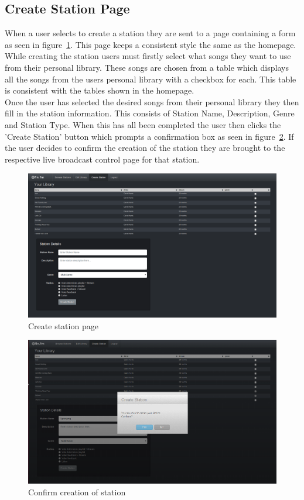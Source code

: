 \documentclass[a4paper, 12pt]{report}
\begin{document}
\subsection{Create Station Page}
When a user selects to create a station they are sent to a page containing a form as seen in figure~\ref{create station}. This page keeps a consistent style the same as the homepage. While creating the station users must firstly select what songs they want to use from their personal library. These songs are chosen from a table which displays all the songs from the users personal library with a checkbox for each. This table is consistent with the tables shown in the homepage.\\
Once the user has selected the desired songs from their personal library they then fill in the station information. This consists of Station Name, Description, Genre and Station Type. When this has all been completed the user then clicks the 'Create Station' button which prompts a confirmation box as seen in figure~\ref{create-confirm}. If the user decides to confirm the creation of the station they are brought to the respective live broadcast control page for that station.
\begin{figure}[H]
  \centering
    \includegraphics[width=1.0\textwidth]{screenshots/create-station.png}
    \caption{Create station page}
    \label{create station}
\end{figure}
\begin{figure}[H]
  \centering
    \includegraphics[width=1.0\textwidth]{screenshots/create-station-confirm.png}
    \caption{Confirm creation of station}
    \label{create-confirm}
\end{figure}
\end{document}

